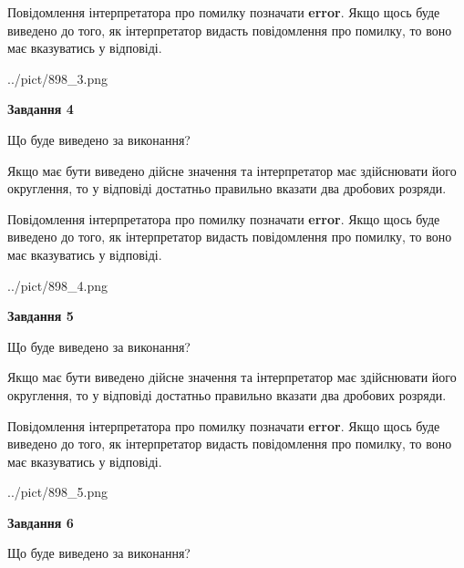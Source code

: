 \documentclass[12pt, ukrainian]{article}
\begin{document}
{\begin {Large}
Повідомлення інтерпретатора про помилку позначати \textbf{error}.
Якщо щось буде виведено до того, як інтерпретатор видасть повідомлення про помилку, 
то воно має вказуватись у відповіді. \par

\begin{center}
	{../pict/898_3.png}
\end{center}
\newpage

{\begin {center}\textbf{Завдання 4}\end {center}}\par
Що буде виведено за виконання? \par

Якщо має бути виведено дійсне значення та інтерпретатор має здійснювати його округлення, 
то у відповіді достатньо правильно вказати два дробових розряди.

Повідомлення інтерпретатора про помилку позначати \textbf{error}.
Якщо щось буде виведено до того, як інтерпретатор видасть повідомлення про помилку, 
то воно має вказуватись у відповіді. \par

\begin{center}
	{../pict/898_4.png}
\end{center}
\newpage

{\begin {center}\textbf{Завдання 5}\end {center}}\par
Що буде виведено за виконання? \par

Якщо має бути виведено дійсне значення та інтерпретатор має здійснювати його округлення, 
то у відповіді достатньо правильно вказати два дробових розряди.

Повідомлення інтерпретатора про помилку позначати \textbf{error}.
Якщо щось буде виведено до того, як інтерпретатор видасть повідомлення про помилку, 
то воно має вказуватись у відповіді. \par

\begin{center}
	{../pict/898_5.png}
\end{center}
\newpage

{\begin {center}\textbf{Завдання 6}\end {center}}\par
Що буде виведено за виконання? \par


\end{Large}}
\end{document}
